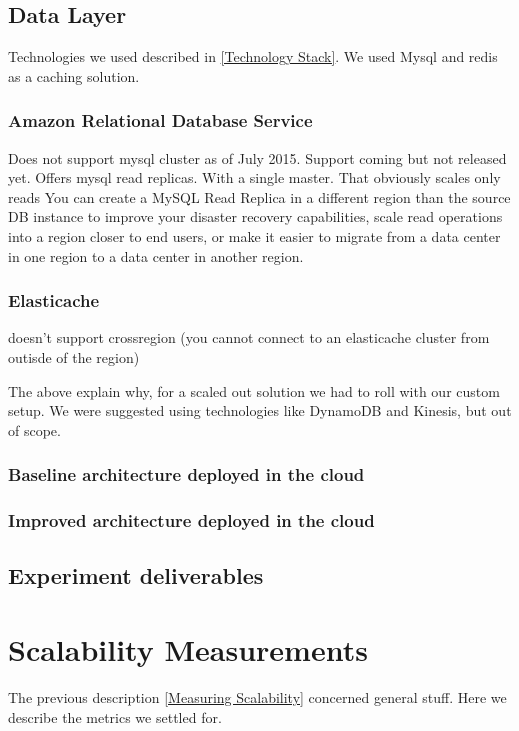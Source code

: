 \documentclass{uvamscse}
\begin{document}
\section{Data Layer}

Technologies we used described in \ref{Technology Stack}. We used Mysql and redis as a caching solution.

\subsection{Amazon Relational Database Service}
Does not support mysql cluster as of July 2015. Support coming but not released yet.
Offers mysql read replicas. With a single master. That obviously scales only reads
You can create a MySQL Read Replica in a different region than the source DB instance to improve your disaster recovery capabilities, scale read operations into a region closer to end users, or make it easier to migrate from a data center in one region to a data center in another region.

\subsection{Elasticache}
doesn't support crossregion (you cannot connect to an elasticache cluster from outisde of the region)

The above explain why, for a scaled out solution we had to roll with our custom setup. We were suggested using technologies like DynamoDB and Kinesis, but out of scope.

\subsection{Baseline architecture deployed in the cloud}

\subsection{Improved architecture deployed in the cloud}

\section{Experiment deliverables}


\chapter{Scalability Measurements} \label{Scalability Measurements}
The previous description \ref{Measuring Scalability} concerned general stuff.
Here we describe the metrics we settled for.
\end{document}
